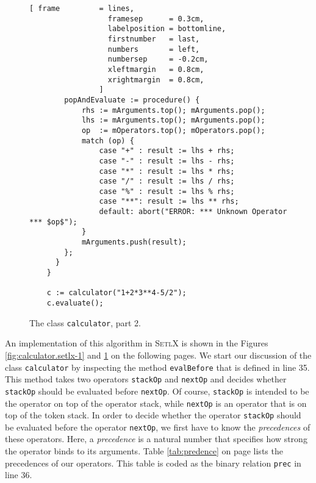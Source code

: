 \begin{figure}[!htb]
  \centering
\begin{Verbatim}[ frame         = lines, 
                  framesep      = 0.3cm, 
                  labelposition = bottomline,
                  firstnumber   = last,
                  numbers       = left,
                  numbersep     = -0.2cm,
                  xleftmargin   = 0.8cm,
                  xrightmargin  = 0.8cm,
                ]
        popAndEvaluate := procedure() {
            rhs := mArguments.top(); mArguments.pop();
            lhs := mArguments.top(); mArguments.pop();
            op  := mOperators.top(); mOperators.pop();
            match (op) {
                case "+" : result := lhs + rhs;
                case "-" : result := lhs - rhs;
                case "*" : result := lhs * rhs;
                case "/" : result := lhs / rhs;
                case "%" : result := lhs % rhs;
                case "**": result := lhs ** rhs;       
                default: abort("ERROR: *** Unknown Operator *** $op$");
            }
            mArguments.push(result);
        };    
      }
    }
    
    c := calculator("1+2*3**4-5/2");
    c.evaluate();
\end{Verbatim}
\vspace*{-0.3cm}
  \caption{The class \texttt{calculator}, part 2.}
  \label{fig:calculator.setlx-2}
\end{figure} 

\noindent
An implementation of this algorithm in \textsc{SetlX} is shown in the Figures
\ref{fig:calculator.setlx-1} and \ref{fig:calculator.setlx-2} on the following pages.
We start our discussion of the class \texttt{calculator} by inspecting the method
\texttt{evalBefore} that is defined in line 35.
This method takes two operators \texttt{stackOp} and \texttt{nextOp} and decides
whether \texttt{stackOp} should be evaluated before \texttt{nextOp}.  Of course, \texttt{stackOp} is
intended to be the operator on top of the operator stack, while \texttt{nextOp} is an operator that
is on top of the token stack.
In order to decide whether the operator \texttt{stackOp} should be evaluated before the operator
\texttt{nextOp},  we first have to know the \emph{precedences} of these operators.  Here, a
\emph{precedence} is a natural number that specifies how strong the operator binds to its
arguments. Table \ref{tab:predence} on page \pageref{tab:predence} lists the precedences of our
operators.  This table is coded as the binary relation \texttt{prec} in line 36.

